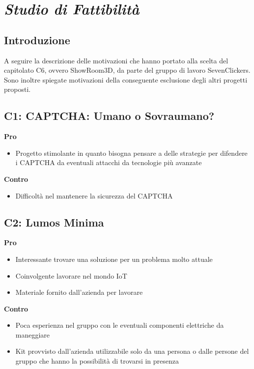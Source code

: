 \newcommand\myfontsize{\fontsize{13pt}{18pt}\selectfont}
\section{\textit{Studio di Fattibilità}}
\subsection{Introduzione}
A seguire la descrizione delle motivazioni che hanno portato alla scelta del capitolato C6, 
ovvero ShowRoom3D, da parte del gruppo di lavoro SevenClickers.
Sono inoltre spiegate motivazioni della conseguente esclusione degli altri progetti proposti.

\subsection{C1: CAPTCHA: Umano o Sovraumano?}

\textbf{Pro}
\begin{itemize}[leftmargin=30pt, rightmargin=2cm]
  \item Progetto stimolante in quanto bisogna pensare a delle strategie per difendere i CAPTCHA da eventuali attacchi da tecnologie più avanzate
\end{itemize}
\textbf{Contro}
\begin{itemize}
    \item Difficoltà nel mantenere la sicurezza del CAPTCHA
\end{itemize}

\subsection{C2: Lumos Minima}
\textbf{Pro}
\begin{itemize}[leftmargin=30pt, rightmargin=2cm]
    \item Interessante trovare una soluzione per un problema molto attuale
    \item Coinvolgente lavorare nel mondo IoT
    \item  Materiale fornito dall’azienda per lavorare
\end{itemize}
\textbf{Contro}
\begin{itemize}
    \item Poca esperienza nel gruppo con le eventuali componenti elettriche da maneggiare
    \item Kit provvisto dall’azienda utilizzabile solo da una persona o dalle persone del gruppo che hanno la possibilità di trovarsi in presenza
\end{itemize}

